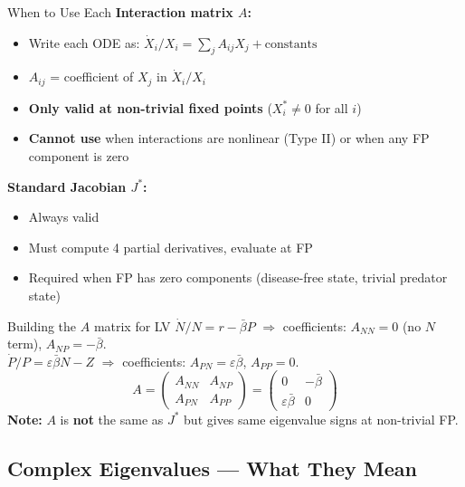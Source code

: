 \documentclass[10pt]{article}
\begin{document}
\begin{rulebox}{When to Use Each}
\textbf{Interaction matrix $A$:}
\begin{itemize}
  \item Write each ODE as: $\dot X_i / X_i = \sum_j A_{ij} X_j + \text{constants}$
  \item $A_{ij}$ = coefficient of $X_j$ in $\dot X_i / X_i$
  \item \textbf{Only valid at non-trivial fixed points} ($X_i^* \neq 0$ for all $i$)
  \item \textbf{Cannot use} when interactions are nonlinear (Type II) or when any FP component is zero
\end{itemize}

\textbf{Standard Jacobian $J^*$:}
\begin{itemize}
  \item Always valid
  \item Must compute 4 partial derivatives, evaluate at FP
  \item Required when FP has zero components (disease-free state, trivial predator state)
\end{itemize}
\end{rulebox}

\begin{exbox}{Building the $A$ matrix for LV}
$\dot N/N = r - \bar\beta P$ $\Rightarrow$ coefficients: $A_{NN} = 0$ (no $N$ term), $A_{NP} = -\bar\beta$.\\
$\dot P/P = \varepsilon\bar\beta N - Z$ $\Rightarrow$ coefficients: $A_{PN} = \varepsilon\bar\beta$, $A_{PP} = 0$.
\[
A = \begin{pmatrix} A_{NN} & A_{NP} \\ A_{PN} & A_{PP} \end{pmatrix} = \begin{pmatrix} 0 & -\bar\beta \\ \varepsilon\bar\beta & 0 \end{pmatrix}
\]
\textbf{Note:} $A$ is \textbf{not} the same as $J^*$ but gives same eigenvalue signs at non-trivial FP.
\end{exbox}

\subsection{Complex Eigenvalues --- What They Mean}
\end{document}
